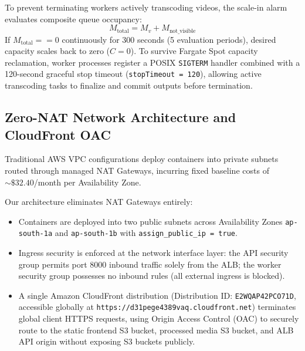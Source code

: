 \documentclass[conference]{IEEEtran}
\begin{document}
To prevent terminating workers actively transcoding videos, the scale-in alarm evaluates composite queue occupancy:
\begin{equation}
    M_{\text{total}} = M_v + M_{\text{not\_visible}}
\end{equation}
If $M_{\text{total}} == 0$ continuously for 300 seconds (5 evaluation periods), desired capacity scales back to zero ($C = 0$). To survive Fargate Spot capacity reclamation, worker processes register a POSIX \texttt{SIGTERM} handler combined with a 120-second graceful stop timeout (\texttt{stopTimeout = 120}), allowing active transcoding tasks to finalize and commit outputs before termination.

\subsection{Zero-NAT Network Architecture and CloudFront OAC}
Traditional AWS VPC configurations deploy containers into private subnets routed through managed NAT Gateways, incurring fixed baseline costs of $\sim\$32.40$/month per Availability Zone. 

Our architecture eliminates NAT Gateways entirely:
\begin{itemize}
    \item Containers are deployed into two public subnets across Availability Zones \texttt{ap-south-1a} and \texttt{ap-south-1b} with \texttt{assign\_public\_ip = true}.
    \item Ingress security is enforced at the network interface layer: the API security group permits port 8000 inbound traffic solely from the ALB; the worker security group possesses no inbound rules (all external ingress is blocked).
    \item A single Amazon CloudFront distribution (Distribution ID: \texttt{E2WQAP42PCO71D}, accessible globally at \texttt{https://d31pege4389vaq.cloudfront.net}) terminates global client HTTPS requests, using Origin Access Control (OAC) to securely route to the static frontend S3 bucket, processed media S3 bucket, and ALB API origin without exposing S3 buckets publicly.
\end{itemize}
\end{document}
